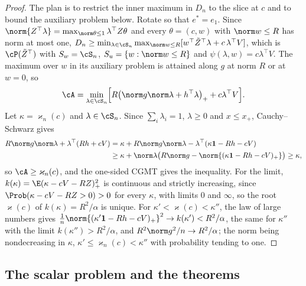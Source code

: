 \begin{refsection}
\begin{proof}
The plan is to restrict the inner maximum in $D_n$ to the slice at $c$ and to bound the auxiliary problem below. Rotate so that $e^*=e_1$. Since $\norm{Z^\top\lambda}=\max_{\norm\theta\le1}\lambda^\top Z\theta$ and every $\theta=(c,w)$ with $\norm w\le R$ has norm at most one, $D_n\ge\min_{\lambda\in\cS_n}\max_{\norm w\le R}[w^\top\tilde Z^\top\lambda+c\,\lambda^\top V]$, which is $\cP(\tilde Z^\top)$ with $S_w=\cS_n$, $S_u=\{w:\norm w\le R\}$ and $\psi(\lambda,w)=c\lambda^\top V$. The maximum over $w$ in its auxiliary problem is attained along $g$ at norm $R$ or at $w=0$, so
\[
\cA=\min_{\lambda\in\cS_n}\Bigl[R\bigl(\norm g\norm\lambda+h^\top\lambda\bigr)_++c\lambda^\top V\Bigr].
\]
Let $\kappa=\varkappa_n(c)$ and $\lambda\in\cS_n$. Since $\sum_i\lambda_i=1$, $\lambda\ge0$ and $x\le x_+$, Cauchy--Schwarz gives
\begin{align*}
R\norm g\norm\lambda+\lambda^\top(Rh+cV)&=\kappa+R\norm g\norm\lambda-\lambda^\top(\kappa\classificationones-Rh-cV)\\
&\ge\kappa+\norm\lambda\bigl(R\norm g-\norm{(\kappa\classificationones-Rh-cV)_+}\bigr)\ge\kappa,
\end{align*}
so $\cA\ge\varkappa_n(c)$, and the one-sided CGMT gives the inequality. For the limit, $k(\kappa)=\E(\kappa-cV-RZ)_+^2$ is continuous and strictly increasing, since $\Prob(\kappa-cV-RZ>0)>0$ for every $\kappa$, with limits $0$ and $\infty$, so the root $\varkappa(c)$ of $k(\kappa)=R^2/\alpha$ is unique. For $\kappa'<\varkappa(c)<\kappa''$, the law of large numbers gives $\frac1n\norm{(\kappa'\classificationones-Rh-cV)_+}^2\to k(\kappa')<R^2/\alpha$, the same for $\kappa''$ with the limit $k(\kappa'')>R^2/\alpha$, and $R^2\norm g^2/n\to R^2/\alpha$; the norm being nondecreasing in $\kappa$, $\kappa'\le\varkappa_n(c)<\kappa''$ with probability tending to one.
\end{proof}

\subsection{The scalar problem and the theorems}


\end{refsection}
